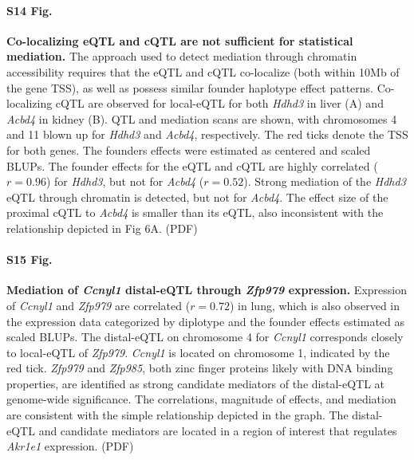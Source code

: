 \documentclass[10pt,letterpaper]{article}
\begin{document}
\paragraph*{S14 Fig.}
\label{S_colocalization}
{\bf Co-localizing eQTL and cQTL are not sufficient for statistical mediation.}
The approach used to detect mediation through chromatin accessibility requires that the eQTL and cQTL co-localize (both within 10Mb of the gene TSS), as well as possess similar founder haplotype effect patterns. Co-localizing cQTL are observed for local-eQTL for both \textit{Hdhd3} in liver (A) and \textit{Acbd4} in kidney (B). QTL and mediation scans are shown, with chromosomes 4 and 11 blown up for \textit{Hdhd3} and \textit{Acbd4}, respectively. The red ticks denote the TSS for both genes. The founders effects were estimated as centered and scaled BLUPs. The founder effects for the eQTL and cQTL are highly correlated ($r = 0.96$) for \textit{Hdhd3}, but not for \textit{Acbd4} ($r = 0.52$). Strong mediation of the \textit{Hdhd3} eQTL through chromatin is detected, but not for \textit{Acbd4}. The effect size of the proximal cQTL to \textit{Acbd4} is smaller than its eQTL, also inconsistent with the relationship depicted in Fig 6A. (PDF)

\paragraph*{S15 Fig.}
\label{S_ccnyl1_exmediation}
{\bf Mediation of \textit{Ccnyl1} distal-eQTL through \textit{Zfp979} expression.}
Expression of \textit{Ccnyl1} and \textit{Zfp979} are correlated ($r = 0.72$) in lung, which is also observed in the expression data categorized by diplotype and the founder effects estimated as scaled BLUPs. The distal-eQTL on chromosome 4 for \textit{Ccnyl1} corresponds closely to local-eQTL of \textit{Zfp979}. \textit{Ccnyl1} is located on chromosome 1, indicated by the red tick. \textit{Zfp979} and \textit{Zfp985}, both zinc finger proteins likely with DNA binding properties, are identified as strong candidate mediators of the distal-eQTL at genome-wide significance. The correlations, magnitude of effects, and mediation are consistent with the simple relationship depicted in the graph. The distal-eQTL and candidate mediators are located in a region of interest that regulates \textit{Akr1e1} expression. (PDF)
\end{document}
